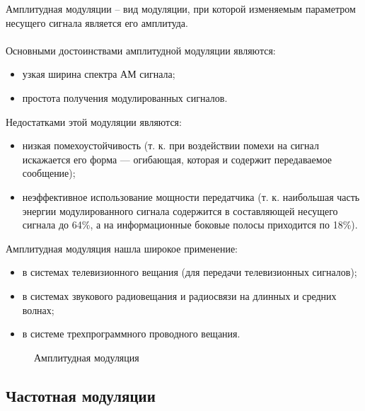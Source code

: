 \documentclass[a4paper,14pt]{extarticle}
\begin{document}
Амплитудная модуляции -- вид модуляции, при которой изменяемым параметром несущего сигнала является его амплитуда.\\\\
Основными достоинствами амплитудной модуляции являются:
\begin{itemize}
\item узкая ширина спектра АМ сигнала;
\item простота получения модулированных сигналов.\\
\end{itemize}
Недостатками этой модуляции являются:
\begin{itemize}
\item низкая помехоустойчивость (т. к. при воздействии помехи на сигнал искажается его форма — огибающая, которая и содержит передаваемое сообщение);
\item неэффективное использование мощности передатчика (т. к. наибольшая часть энергии модулированного сигнала содержится в составляющей несущего сигнала до 64\%, а на информационные боковые полосы приходится по 18\%).\\
\end{itemize}
Амплитудная модуляция нашла широкое применение:
\begin{itemize}
\item в системах телевизионного вещания (для передачи телевизионных сигналов);
\item в системах звукового радиовещания и радиосвязи на длинных и средних волнах;
\item в системе трехпрограммного проводного вещания.
\end{itemize}

\begin{figure}[H]
\caption{Амплитудная модуляция}
\end{figure}

\subsection{Частотная модуляции}
\end{document}
